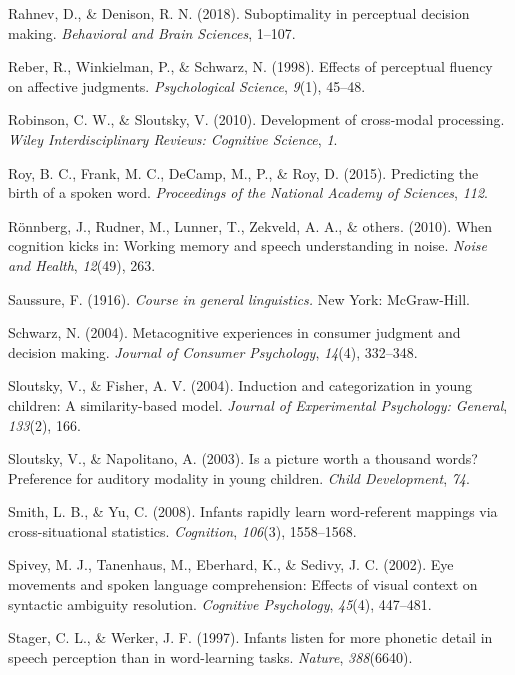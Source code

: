 \documentclass[english,,man,floatsintext]{apa6}
\theoremstyle{definition}
\theoremstyle{definition}
\theoremstyle{definition}
\theoremstyle{remark}
\begin{document}
\hypertarget{ref-rahnev2018}{}
Rahnev, D., \& Denison, R. N. (2018). Suboptimality in perceptual
decision making. \emph{Behavioral and Brain Sciences}, 1--107.

\hypertarget{ref-reber98}{}
Reber, R., Winkielman, P., \& Schwarz, N. (1998). Effects of perceptual
fluency on affective judgments. \emph{Psychological Science},
\emph{9}(1), 45--48.

\hypertarget{ref-robinson2010}{}
Robinson, C. W., \& Sloutsky, V. (2010). Development of cross-modal
processing. \emph{Wiley Interdisciplinary Reviews: Cognitive Science},
\emph{1}.

\hypertarget{ref-roy2015}{}
Roy, B. C., Frank, M. C., DeCamp, M., P., \& Roy, D. (2015). Predicting
the birth of a spoken word. \emph{Proceedings of the National Academy of
Sciences}, \emph{112}.

\hypertarget{ref-ronnberg2010}{}
Rönnberg, J., Rudner, M., Lunner, T., Zekveld, A. A., \& others. (2010).
When cognition kicks in: Working memory and speech understanding in
noise. \emph{Noise and Health}, \emph{12}(49), 263.

\hypertarget{ref-saussure1916}{}
Saussure, F. (1916). \emph{Course in general linguistics.} New York:
McGraw-Hill.

\hypertarget{ref-schwarz2004}{}
Schwarz, N. (2004). Metacognitive experiences in consumer judgment and
decision making. \emph{Journal of Consumer Psychology}, \emph{14}(4),
332--348.

\hypertarget{ref-sloutsky2004}{}
Sloutsky, V., \& Fisher, A. V. (2004). Induction and categorization in
young children: A similarity-based model. \emph{Journal of Experimental
Psychology: General}, \emph{133}(2), 166.

\hypertarget{ref-sloutsky2003}{}
Sloutsky, V., \& Napolitano, A. (2003). Is a picture worth a thousand
words? Preference for auditory modality in young children. \emph{Child
Development}, \emph{74}.

\hypertarget{ref-smith08}{}
Smith, L. B., \& Yu, C. (2008). Infants rapidly learn word-referent
mappings via cross-situational statistics. \emph{Cognition},
\emph{106}(3), 1558--1568.

\hypertarget{ref-spivey2002}{}
Spivey, M. J., Tanenhaus, M., Eberhard, K., \& Sedivy, J. C. (2002). Eye
movements and spoken language comprehension: Effects of visual context
on syntactic ambiguity resolution. \emph{Cognitive Psychology},
\emph{45}(4), 447--481.

\hypertarget{ref-stager1997}{}
Stager, C. L., \& Werker, J. F. (1997). Infants listen for more phonetic
detail in speech perception than in word-learning tasks. \emph{Nature},
\emph{388}(6640).
\end{document}
